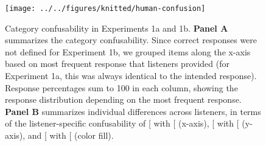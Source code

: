 \documentclass[preprint]{JASA}
\begin{document}
\begin{figure}[!ht]

{\centering \texttt{[image: ../../figures/knitted/human-confusion]} 

}

\caption{Category confusability in Experiments 1a and 1b. \textbf{Panel A} summarizes the category confusability. Since correct responses were not defined for Experiment 1b, we grouped items along the x-axis based on most frequent response that listeners provided (for Experiment 1a, this was always identical to the intended response). Response percentages sum to 100 in each column, showing the response distribution depending on the most frequent response. \textbf{Panel B} summarizes individual differences across listeners, in terms of the listener-specific confusability of {[}\ipatext{ɪ}{]} with {[}\ipatext{ɛ}{]} (x-axis), {[}\ipatext{ɛ}{]} with {[}\ipatext{æ}{]} (y-axis), and {[}\ipatext{u}{]} with {[}\ipatext{ʊ}{]} (color fill).}\label{fig:human-confusion}
\end{figure}
\end{document}
